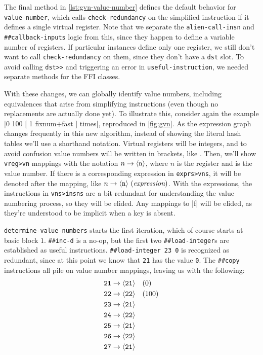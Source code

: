The final method in \vref{lst:gvn-value-number} defines the default behavior
for \Verb|value-number|, which calls \Verb|check-redundancy| on the
simplified instruction if it defines a single virtual register.  Note that we
separate the \Verb|alien-call-insn| and \Verb|##callback-inputs| logic from
this, since they happen to define a variable number of registers.  If
particular instances define only one register, we still don't want to call
\Verb|check-redundancy| on them, since they don't have a \Verb|dst| slot.
To avoid calling \Verb|dst>>| and triggering an error in
\Verb|useful-instruction|, we needed separate methods for the \gls{FFI}
classes.


With these changes, we can globally identify value numbers, including
equivalences that arise from simplifying instructions (even though no
replacements are actually done yet).  To illustrate this, consider again the
example
%
\factor|0 100 [ 1 fixnum+fast ] times|,
%
reproduced in \vref{fig:gvn}.  As the expression graph changes frequently in
this new algorithm, instead of showing the literal hash tables we'll use a
shorthand notation.  Virtual registers will be integers, and to avoid confusion
value numbers will be written in brackets, like .  Then, we'll show
\Verb|vreg>vn| mappings with the notation $n\to\langle\texttt{n}\rangle$, where $n$ is the
register and  is the value number.  If there is a corresponding
expression in \Verb|exprs>vns|, it will be denoted after the mapping, like
$n\to\langle\texttt{n}\rangle~(\textit{expression})$.  With the expressions, the instructions in
\Verb|vns>insns| are a bit redundant for understanding the value numbering
process, so they will be elided.  Any mappings to \factor|f| will be elided, as
they're understood to be implicit when a key is absent.


\Verb|determine-value-numbers| starts the first iteration, which of course
starts at basic block $1$.  \Verb|##inc-d| is a no-op, but the first two
\Verb|##load-integer|s are established as useful instructions.
%
\Verb|##load-integer 23 0|
%
is recognized as redundant, since at this point we know that \Verb|21| has
the value \Verb|0|.  The \Verb|##copy| instructions all pile on value
number mappings, leaving us with the following:
%
\begin{align*}
  \texttt{21} &\to \langle\texttt{21}\rangle \quad (0)  \\
  \texttt{22} &\to \langle\texttt{22}\rangle \quad (100)\\
  \texttt{23} &\to \langle\texttt{21}\rangle            \\
  \texttt{24} &\to \langle\texttt{22}\rangle            \\
  \texttt{25} &\to \langle\texttt{21}\rangle            \\
  \texttt{26} &\to \langle\texttt{22}\rangle            \\
  \texttt{27} &\to \langle\texttt{21}\rangle
\end{align*}

